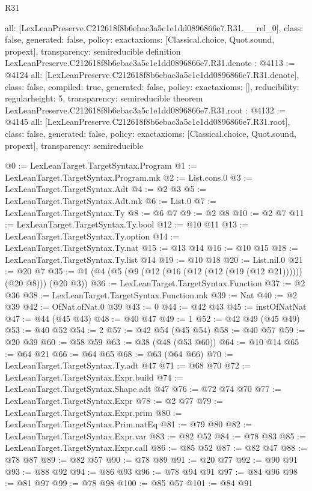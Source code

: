 \begin{lexlean}{R31}
\begin{coremodule}
{  all: [LexLeanPreserve.C212618f8b6ebac3a5c1e1dd0896866e7.R31.__rel_0],
  class: false,
  generated: false,
  policy: exact{axioms: [Classical.choice, Quot.sound, propext]},
  transparency: semireducible
}
definition LexLeanPreserve.C212618f8b6ebac3a5c1e1dd0896866e7.R31.denote : @4113 := @4124 {
  all: [LexLeanPreserve.C212618f8b6ebac3a5c1e1dd0896866e7.R31.denote],
  class: false,
  compiled: true,
  generated: false,
  policy: exact{axioms: []},
  reducibility: regular{height: 5},
  transparency: semireducible
}
theorem LexLeanPreserve.C212618f8b6ebac3a5c1e1dd0896866e7.R31.root : @4132 := @4145 {
  all: [LexLeanPreserve.C212618f8b6ebac3a5c1e1dd0896866e7.R31.root],
  class: false,
  generated: false,
  policy: exact{axioms: [Classical.choice, Quot.sound, propext]},
  transparency: semireducible
}

@0 := LexLeanTarget.TargetSyntax.Program
@1 := LexLeanTarget.TargetSyntax.Program.mk
@2 := List.cons.{0}
@3 := LexLeanTarget.TargetSyntax.Adt
@4 := @2 @3
@5 := LexLeanTarget.TargetSyntax.Adt.mk
@6 := List.{0}
@7 := LexLeanTarget.TargetSyntax.Ty
@8 := @6 @7
@9 := @2 @8
@10 := @2 @7
@11 := LexLeanTarget.TargetSyntax.Ty.bool
@12 := @10 @11
@13 := LexLeanTarget.TargetSyntax.Ty.option
@14 := LexLeanTarget.TargetSyntax.Ty.nat
@15 := @13 @14
@16 := @10 @15
@18 := LexLeanTarget.TargetSyntax.Ty.list @14
@19 := @10 @18
@20 := List.nil.{0}
@21 := @20 @7
@35 := @1 (@4 (@5 (@9 (@12 (@16 (@12 (@12 (@19 (@12 @21)))))) (@20 @8))) (@20 @3))
@36 := LexLeanTarget.TargetSyntax.Function
@37 := @2 @36
@38 := LexLeanTarget.TargetSyntax.Function.mk
@39 := Nat
@40 := @2 @39
@42 := OfNat.ofNat.{0} @39
@43 := 0
@44 := @42 @43
@45 := instOfNatNat
@47 := @44 (@45 @43)
@48 := @40 @47
@49 := 1
@52 := @42 @49 (@45 @49)
@53 := @40 @52
@54 := 2
@57 := @42 @54 (@45 @54)
@58 := @40 @57
@59 := @20 @39
@60 := @58 @59
@63 := @38 (@48 (@53 @60))
@64 := @10 @14
@65 := @64 @21
@66 := @64 @65
@68 := @63 (@64 @66)
@70 := LexLeanTarget.TargetSyntax.Ty.adt @47
@71 := @68 @70
@72 := LexLeanTarget.TargetSyntax.Expr.build
@74 := LexLeanTarget.TargetSyntax.Shape.adt @47
@76 := @72 @74 @70
@77 := LexLeanTarget.TargetSyntax.Expr
@78 := @2 @77
@79 := LexLeanTarget.TargetSyntax.Expr.prim
@80 := LexLeanTarget.TargetSyntax.Prim.natEq
@81 := @79 @80
@82 := LexLeanTarget.TargetSyntax.Expr.var
@83 := @82 @52
@84 := @78 @83
@85 := LexLeanTarget.TargetSyntax.Expr.call
@86 := @85 @52
@87 := @82 @47
@88 := @78 @87
@89 := @82 @57
@90 := @78 @89
@91 := @20 @77
@92 := @90 @91
@93 := @88 @92
@94 := @86 @93
@96 := @78 @94 @91
@97 := @84 @96
@98 := @81 @97
@99 := @78 @98
@100 := @85 @57
@101 := @84 @91

\end{coremodule}
\end{lexlean}
